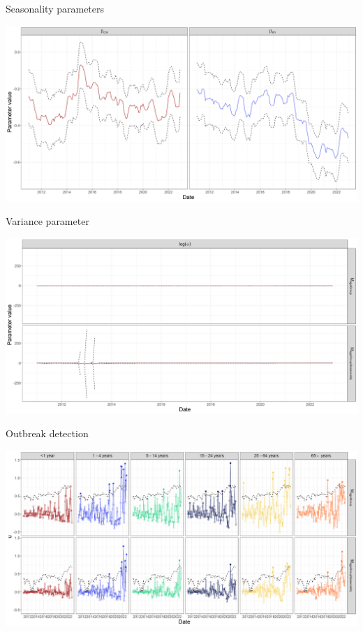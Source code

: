 \documentclass[aspectratio=169]{beamer}
\begin{document}
\begin{frame}{Seasonality parameters}
\protect\hypertarget{seasonality-parameters}{}
\tiny

\includegraphics[width=1\linewidth]{../figures/SeasonalityParxSTEC_PoisN}

\normalsize
\end{frame}

\begin{frame}{Variance parameter}
\protect\hypertarget{variance-parameter}{}
\tiny

\includegraphics[width=1\linewidth]{../figures/log_sigmaxSTEC_PoisN}

\normalsize
\end{frame}

\begin{frame}{Outbreak detection}
\protect\hypertarget{outbreak-detection}{}
\tiny

\includegraphics[width=1\linewidth]{../figures/OutbreakDetectionxSTEC_PoisN}

\normalsize
\end{frame}
\end{document}
